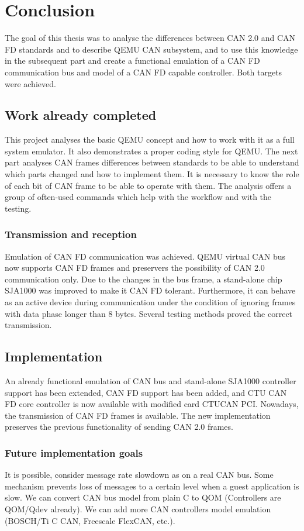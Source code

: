 \documentclass{ctuthesis}
\begin{document}
 
\chapter{Conclusion}
 The goal of this thesis was to analyse the differences between CAN 2.0 and CAN FD standards and to describe QEMU CAN subsystem, and to use this knowledge in the subsequent part and create a functional emulation of a CAN FD communication bus and model of a CAN FD capable controller. Both targets were achieved.

 \section{Work already completed}
  This project analyses the basic QEMU concept and how to work with it as a full system emulator. It also demonstrates a proper coding style for QEMU. The next part analyses CAN frames differences between standards to be able to understand which parts changed and how to implement them. It is necessary to know the role of each bit of CAN frame to be able to operate with them. The analysis offers a group of often-used commands which help with the workflow and with the testing.
 
 \subsection{Transmission and reception}
  Emulation of CAN FD communication was achieved. QEMU virtual CAN bus now supports CAN FD frames and preservers the possibility of CAN 2.0 communication only. Due to the changes in the bus frame, a stand-alone chip SJA1000 was improved to make it CAN FD tolerant. Furthermore, it can behave as an active device during communication under the condition of ignoring frames with data phase longer than 8 bytes. Several testing methods proved the correct transmission.

 \section{Implementation}
  An already functional emulation of CAN bus and stand-alone SJA1000 controller support has been extended, CAN FD support has been added, and  CTU CAN FD core controller is now available with modified card CTUCAN PCI. Nowadays, the transmission of CAN FD frames is available. The new implementation preserves the previous functionality of sending CAN 2.0 frames.

 \subsection{Future implementation goals}
  It is possible, consider message rate slowdown as on a real CAN bus. Some mechanism prevents loss of messages to a certain level when a guest application is slow. We can convert CAN bus model from plain C to QOM (Controllers are QOM/Qdev already). We can add more CAN controllers model emulation (BOSCH/Ti C CAN, Freescale FlexCAN, etc.).
 
\end{document}
